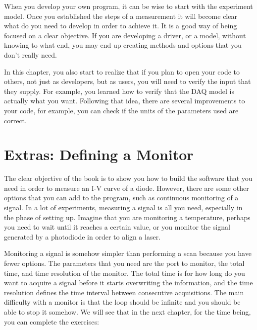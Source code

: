 When you develop your own program, it can be wise to start with the
experiment model. Once you established the steps of a measurement it
will become clear what do you need to develop in order to achieve it. It
is a good way of being focused on a clear objective. If you are
developing a driver, or a model, without knowing to what end, you may
end up creating methods and options that you don't really need.

In this chapter, you also start to realize that if you plan to open your
code to others, not just as developers, but as users, you will need to
verify the input that they supply. For example, you learned how to
verify that the {DAQ} model is actually what you want. Following that
idea, there are several improvements to your code, for example, you can
check if the units of the parameters used are correct.

\section{Extras: Defining a Monitor}\label{extras-defining-amonitor}
The clear objective of the book is to show you how to build the software
that you need in order to measure an I-V curve of a diode. However,
there are some other options that you can add to the program, such as
continuous monitoring of a signal. In a lot of experiments, measuring a
signal is all you need, especially in the phase of setting up. Imagine
that you are monitoring a temperature, perhaps you need to wait until it
reaches a certain value, or you monitor the signal generated by a
photodiode in order to align a laser.

Monitoring a signal is somehow simpler than performing a scan because
you have fewer options. The parameters that you need are the port to
monitor, the total time, and time resolution of the monitor. The total
time is for how long do you want to acquire a signal before it starts
overwriting the information, and the time resolution defines the time
interval between consecutive acquisitions. The main difficulty with a
monitor is that the loop should be infinite and you should be able to
stop it somehow. We will see that in the next chapter, for the time
being, you can complete the exercises:



